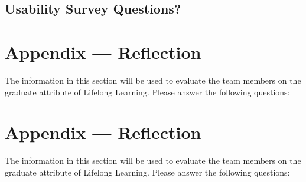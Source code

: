\documentclass[12pt, titlepage]{article}
\begin{document}
\subsection{Usability Survey Questions?}



\newpage{}
\section*{Appendix --- Reflection}

The information in this section will be used to evaluate the team members on the
graduate attribute of Lifelong Learning.  Please answer the following questions:

\newpage{}
\section*{Appendix --- Reflection}



The information in this section will be used to evaluate the team members on the
graduate attribute of Lifelong Learning.  Please answer the following questions:
\end{document}
